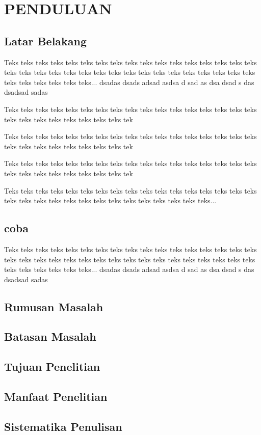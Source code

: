 \chapter{PENDULUAN}
\section{Latar Belakang}
Teks teks teks teks teks teks teks teks teks teks teks teks teks teks teks teks teks teks teks teks teks teks teks teks teks teks teks teks teks teks teks teks teks teks teks teks teks teks teks teks... dsadas dsads adsad asdsa d sad as dsa dsad s das dsadsad sadas 


\begin{contoh}
Teks teks teks teks teks teks teks teks teks teks teks teks teks teks teks teks teks teks teks teks teks teks teks teks teks tek
\end{contoh}

\begin{contoh}
Teks teks teks teks teks teks teks teks teks teks teks teks teks teks teks teks teks teks teks teks teks teks teks teks teks tek
\end{contoh}

\begin{teorema}
Teks teks teks teks teks teks teks teks teks teks teks teks teks teks teks teks teks teks teks teks teks teks teks teks teks tek
\end{teorema}

Teks teks teks teks teks teks teks teks teks teks teks teks teks teks teks teks teks teks teks teks teks teks teks teks teks teks teks teks teks teks teks...

\section{coba}
Teks teks teks teks teks teks teks teks teks teks teks teks teks teks teks teks teks teks teks teks teks teks teks teks teks teks teks teks teks teks teks teks teks teks teks teks teks teks teks teks... dsadas dsads adsad asdsa d sad as dsa dsad s das dsadsad sadas 


\section{Rumusan Masalah}


\section{Batasan Masalah}

\section{Tujuan Penelitian}

\section{Manfaat Penelitian}


\section{Sistematika Penulisan}
